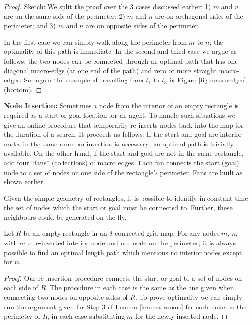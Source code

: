 \begin{proof}Sketch:
We split the proof over the 3 cases discussed earlier: 1) {$m$ and $n$ are on
the same side of the perimeter;} 2) {\label{lemma-rooms-step2}$m$ and $n$ are on
orthogonal sides of the perimeter;} and 3) {\label{lemma-rooms-step3} $m$ and
$n$ are on opposite sides of the perimeter.}

In the first case we can simply walk along the perimeter from $m$ to $n$; the
optimality of this path is immediate. In the second and third case we argue as
follows:
the two nodes can be connected through an optimal path that has one diagonal macro-edge
(at one end of the path) and zero or more straight macro-edges.
See again the example of travelling from $t_1$ to $t_3$ in Figure \ref{fig-macroedges} (bottom).
\end{proof}

\noindent
\textbf{Node Insertion:}
Sometimes a node from the interior of an empty rectangle is required as a start
or goal location for an agent.  To handle such situations we give an online
procedure that temporarily re-inserts nodes back into the map for the duration
of a search.  It proceeds as follows: {If the start and goal are interior nodes
in the same room no insertion is necessary; an optimal path is trivially
available. } {On the other hand, if the start and goal are not in the same
rectangle, add four ``fans'' (collections) of macro edges.  Each fan connects
the start (goal) node to a set of nodes on one side of the rectangle's
perimeter.  Fans are built as shown earlier.}

Given the simple geometry of rectangles, it is possible to identify in constant
time the set of nodes which the start or goal must be connected to.  Further,
these neighbours could be generated on the fly.

\begin{lemma}
\label{lemma-insertion}
Let $R$ be an empty rectangle in an 8-connected grid map.  For any
nodes $m$, $n$, with $m$ a re-inserted interior node and $n$ a node on the
perimeter, it is always possible to find an optimal length path which mentions
no interior nodes except for $m$.
\end{lemma}
\begin{proof}
Our re-insertion procedure connects the start or goal to a set of nodes on each
side of $R$.  The procedure in each case is the same as the one given when
connecting two nodes on opposite sides of $R$.  To prove optimality we can
simply run the argument given for Step 3 of Lemma \ref{lemma-rooms} for each
node on the perimeter of $R$, in each case substituting $m$ for the newly
inserted node.
\end{proof}

